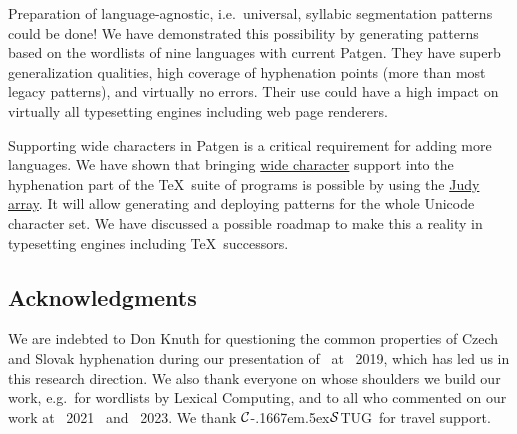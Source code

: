 \documentclass{csbulletin}
\let\program=\textrm %
\let\acro\relax
\providecommand\CSabbr{\ensuremath{\cal C}\kern-.1667em\lower.5ex\hbox{$\cal S$}}
\providecommand\CSTUG{\CSabbr TUG\xspace}
\newcommand{\Patgen}{\program{Patgen}\xspace}
\begin{document}
Preparation of language-agnostic, i.e.\ universal, syllabic segmentation patterns could be done! 
We have demonstrated this possibility by generating patterns based on the wordlists of nine languages with current \Patgen.
They have superb generalization qualities, high coverage of hyphenation points (more than most legacy patterns), and virtually no errors.
Their use could have a high impact on virtually all typesetting engines including web page renderers.

Supporting wide characters in \Patgen is a critical requirement for adding more languages.
We have shown that bringing \href{https://en.wikipedia.org/wiki/Wide_character}{wide character} support into the hyphenation part of the \TeX\ suite of programs is possible by using the \href{https://en.wikipedia.org/wiki/Judy_array}{Judy array}.
It will allow generating and deploying patterns for the whole Unicode character set. 
We have discussed a possible roadmap to make this a reality in typesetting engines including \TeX\ successors.

\vspace{-2pt}

\subsection*{Acknowledgments}
We are indebted to Don Knuth for questioning the common properties of Czech and Slovak hyphenation during our presentation of~\cite{tex:sojkas2019unreasonable} at \acro{TUG}~2019, which has led us in this research direction.
We also thank everyone on whose shoulders we build our work, e.g.\ for wordlists by Lexical Computing, and to all who commented on our work at \acro{TUG}~2021~\cite{tex:sojkas2021czechoslovak} and \acro{TUG}~2023. 
We thank \CSTUG\ for \acro{TUG} travel support.

\begingroup
\sloppy
\printbibliography
\endgroup
\end{document}
